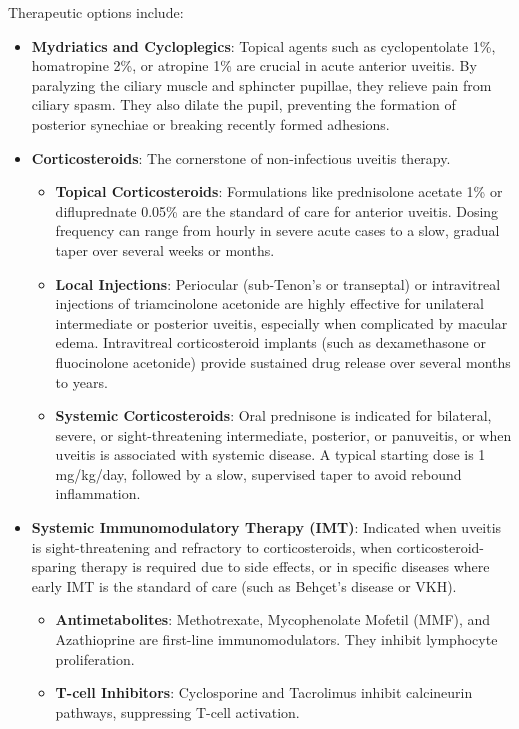 Therapeutic options include:
\begin{itemize}
    \item \textbf{Mydriatics and Cycloplegics}: Topical agents such as cyclopentolate 1\%, homatropine 2\%, or atropine 1\% are crucial in acute anterior uveitis. By paralyzing the ciliary muscle and sphincter pupillae, they relieve pain from ciliary spasm. They also dilate the pupil, preventing the formation of posterior synechiae or breaking recently formed adhesions.
    \item \textbf{Corticosteroids}: The cornerstone of non-infectious uveitis therapy.
    \begin{itemize}
        \item \textbf{Topical Corticosteroids}: Formulations like prednisolone acetate 1\% or difluprednate 0.05\% are the standard of care for anterior uveitis. Dosing frequency can range from hourly in severe acute cases to a slow, gradual taper over several weeks or months.
        \item \textbf{Local Injections}: Periocular (sub-Tenon's or transeptal) or intravitreal injections of triamcinolone acetonide are highly effective for unilateral intermediate or posterior uveitis, especially when complicated by macular edema. Intravitreal corticosteroid implants (such as dexamethasone or fluocinolone acetonide) provide sustained drug release over several months to years.
        \item \textbf{Systemic Corticosteroids}: Oral prednisone is indicated for bilateral, severe, or sight-threatening intermediate, posterior, or panuveitis, or when uveitis is associated with systemic disease. A typical starting dose is 1 mg/kg/day, followed by a slow, supervised taper to avoid rebound inflammation.
    \end{itemize}
    \item \textbf{Systemic Immunomodulatory Therapy (IMT)}: Indicated when uveitis is sight-threatening and refractory to corticosteroids, when corticosteroid-sparing therapy is required due to side effects, or in specific diseases where early IMT is the standard of care (such as Beh\c{c}et's disease or VKH).
    \begin{itemize}
        \item \textbf{Antimetabolites}: Methotrexate, Mycophenolate Mofetil (MMF), and Azathioprine are first-line immunomodulators. They inhibit lymphocyte proliferation.
        \item \textbf{T-cell Inhibitors}: Cyclosporine and Tacrolimus inhibit calcineurin pathways, suppressing T-cell activation.

\end{itemize}
\end{itemize}
